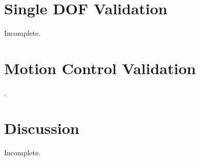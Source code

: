
\section{Single DOF Validation} %
\label{sec:1dof_validation}
Incomplete. 

\section{Motion Control Validation} %
\label{sec:motion_control_validation}
\Incomplete. 

\section{Discussion} %
\label{sec:experiments_discussion}
Incomplete. 

